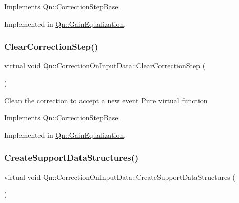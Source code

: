 Implements \mbox{\hyperlink{classQn_1_1CorrectionStepBase_aa778d3926bb1ee463753466f2216187d}{Qn\+::\+Correction\+Step\+Base}}.



Implemented in \mbox{\hyperlink{classQn_1_1GainEqualization_a167a6348fcdf8c0f48cb16a3dd9d1c29}{Qn\+::\+Gain\+Equalization}}.

\mbox{\label{classQn_1_1CorrectionOnInputData_a8da92a3389c8654961199f123d5e6a6d}} 
\subsubsection{\texorpdfstring{Clear\+Correction\+Step()}{ClearCorrectionStep()}}
{\footnotesize\ttfamily virtual void Qn\+::\+Correction\+On\+Input\+Data\+::\+Clear\+Correction\+Step (\begin{DoxyParamCaption}{ }\end{DoxyParamCaption})\hspace{0.3cm}{\ttfamily [pure virtual]}}

Clean the correction to accept a new event Pure virtual function 

Implements \mbox{\hyperlink{classQn_1_1CorrectionStepBase_a879c47010a868c19bd08042445662e2e}{Qn\+::\+Correction\+Step\+Base}}.



Implemented in \mbox{\hyperlink{classQn_1_1GainEqualization_a8ee1f2ecf6929de35d455515a067ac9c}{Qn\+::\+Gain\+Equalization}}.

\mbox{\label{classQn_1_1CorrectionOnInputData_a7da5cb5e6c82e28e2dd63d82ac82bc8a}} 
\subsubsection{\texorpdfstring{Create\+Support\+Data\+Structures()}{CreateSupportDataStructures()}}
{\footnotesize\ttfamily virtual void Qn\+::\+Correction\+On\+Input\+Data\+::\+Create\+Support\+Data\+Structures (\begin{DoxyParamCaption}{ }\end{DoxyParamCaption})\hspace{0.3cm}{\ttfamily [pure virtual]}}

